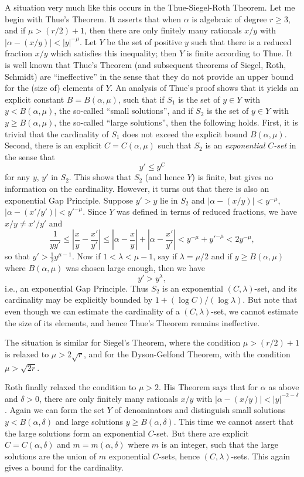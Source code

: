 A situation very much like this occurs in the Thue-Siegel-Roth Theorem. Let me begin with Thue's Theorem. It asserts that when $\alpha$ is algebraic of degree $r\geq 3$, and if $\mu>(r/2)+1$, then there are only finitely many rationals $x/y$ with $|\alpha-(x/y)|<|y|^{-\mu}$. Let $Y$ be the set of positive $y$ such that there is a reduced fraction $x/y$ which satisfies this inequality; then $Y$ is finite according to Thue. It is well known that Thue's Theorem (and subsequent theorems of Siegel, Roth, Schmidt) are ``ineffective'' in the sense that they do not provide an upper bound for the (size of) elements of $Y$. An analysis of Thue's proof shows that it yields an explicit constant $B=B(\alpha,\mu)$, such that if $S_{1}$ is the set of $y\in Y$ with $y<B(\alpha,\mu)$, the so-called ``small solutions'', and if $S_{2}$ is the set of $y\in Y$ with $y\geq B(\alpha,\mu)$, the so-called ``large solutions'', then the following holds. First, it is trivial that the cardinality of $S_{1}$ does not exceed the explicit bound $B(\alpha,\mu)$. Second, there is an explicit $C=C(\alpha,\mu)$ such that $S_{2}$ is an {\em exponential $C$-set} in the sense that
$$
y'\leq y^{C}
$$\pageoriginale
for any $y$, $y'$ in $S_{2}$. This shows that $S_{2}$ (and hence $Y$) is finite, but gives no information on the cardinality. However, it turns out that there is also an exponential Gap Principle. Suppose $y'>y$ lie in $S_{2}$ and $|\alpha-(x/y)|<y^{-\mu}$, $|\alpha-(x'/y')|<{y'}^{-\mu}$. Since $Y$ was defined in terms of reduced fractions, we have $x/y\neq x'/y'$ and
$$
\frac{1}{yy'}\leq \left|\frac{x}{y}-\frac{x'}{y'}\right|\leq \left|\alpha-\frac{x}{y}\right|+\left|\alpha-\frac{x'}{y'}\right|<y^{-\mu}+{y'}^{-\mu}<2y^{-\mu},
$$
so that $y'>\frac{1}{2}y^{\mu-1}$. Now if $1<\lambda<\mu-1$, say if $\lambda=\mu/2$ and if $y\geq B(\alpha,\mu)$ where $B(\alpha,\mu)$ was chosen large enough, then we have
$$
y'>y^{\lambda},
$$
i.e., an exponential Gap Principle. Thus $S_{2}$ is an exponential $(C,\lambda)$-set, and its cardinality may be explicitly bounded by $1+(\log C)/(\log \lambda)$. But note that even though we can estimate the cardinality of a $(C,\lambda)$-set, we cannot estimate the size of its elements, and hence Thue's Theorem remains ineffective.

The situation is similar for Siegel's Theorem, where the condition $\mu>(r/2)+1$ is relaxed to $\mu>2\sqrt{r}$, and for the Dyson-Gelfond Theorem, with the condition $\mu>\sqrt{2r}$.

Roth finally relaxed the condition to $\mu>2$. His Theorem says that for $\alpha$ as above and $\delta>0$, there are only finitely many rationals $x/y$ with $|\alpha-(x/y)|<|y|^{-2-\delta}$. Again we can form the set $Y$ of denominators and distinguish small solutions $y<B(\alpha,\delta)$ and large solutions $y\geq B(\alpha,\delta)$. This time we cannot assert that the large solutions form an exponential $C$-set. But there are explicit $C=C(\alpha,\delta)$ and $m=m(\alpha,\delta)$ where $m$ is an integer, such that the large solutions are the union of $m$ exponential $C$-sets, hence $(C,\lambda)$-sets. This again gives a bound for the cardinality.

